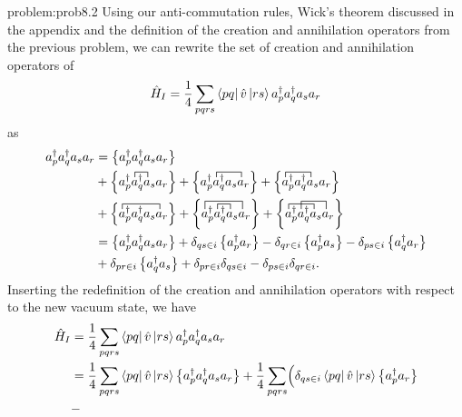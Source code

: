   \begin{sol}{problem:prob8.2}
  Using our anti-commutation rules, Wick's theorem discussed in the
  appendix and the definition of the creation and annihilation
  operators from the previous problem, we can rewrite the set of
  creation and annihilation operators of
      \begin{equation*}
          \hat{H}_I = \frac{1}{4} \sum_{pqrs}
          \bra{pq}\hat{v}\ket{rs} a^\dagger_p a^\dagger_q a_s a_r
      \end{equation*}
  as
  \begin{align*}
      a^\dagger_p a^\dagger_q a_s a_r &=\normord{a^\dagger_p
        a^\dagger_q a_s a_r} \\ & + \normord{
        \contraction{a^\dagger_p}{a}{{}^\dagger_q}{a}a^\dagger_p
        a^\dagger_q a_s a_r}+
      \normord{\contraction{a^\dagger_p}{a}{{}^\dagger_q a_s}{a}
        a^\dagger_p a^\dagger_q a_s a_r}+
      \normord{\contraction{}{a}{{}^\dagger_p
          a^\dagger_q}{a}a^\dagger_p a^\dagger_q a_s a_r} \\ & +
      \normord{\contraction{}{a}{{}^\dagger_p a^\dagger_q
          a_s}{a}a^\dagger_p a^\dagger_q a_s a_r}+
      \normord{\contraction[1.5ex]{}{a}{{}^\dagger_p a_q^\dagger
          a_s}{a}
        \contraction{a^\dagger_p}{a}{{}^\dagger_q}{a}a^\dagger_p
        a^\dagger_q a_s a_r}+ \normord{\contraction{}{a}{{}^\dagger_p
          a_q^\dagger}{a}\contraction[1.5ex]{a^\dagger_p}{a}{{}^\dagger_q
          a_s}{a}a^\dagger_p a^\dagger_q a_s a_r} \\ &=
      \normord{a^\dagger_p a^\dagger_q a_s a_r}+ \delta_{qs\in i}
      \normord{ a^\dagger_p a_r}- \delta_{qr \in i}
      \normord{a^\dagger_p a_s} - \delta_{ps \in i}
      \normord{a^\dagger_q a_r}\\ & + \delta_{pr \in i}
      \normord{a^\dagger_q a_s} + \delta_{pr \in i} \delta_{qs \in i}
      - \delta_{ps \in i} \delta_{qr \in i}.
  \end{align*}
   Inserting the redefinition of the creation and annihilation
   operators with respect to the new vacuum state, we have
      \begin{align*}
      \hat{H}_I &= \frac{1}{4} \sum_{pqrs} \element{pq}{\hat{v}}{rs}
      a^\dagger_p a^\dagger_q a_s a_r \\ &= \frac{1}{4} \sum_{pqrs}
      \element{pq}{\hat{v}}{rs} \normord{a^\dagger_p a^\dagger_q a_s
        a_r} + \frac{1}{4} \sum_{pqrs} \Bigl( \delta_{qs\in i}
      \element{pq}{\hat{v}}{rs} \normord{ a^\dagger_p a_r}\\ & -

\end{align*}
\end{sol}
